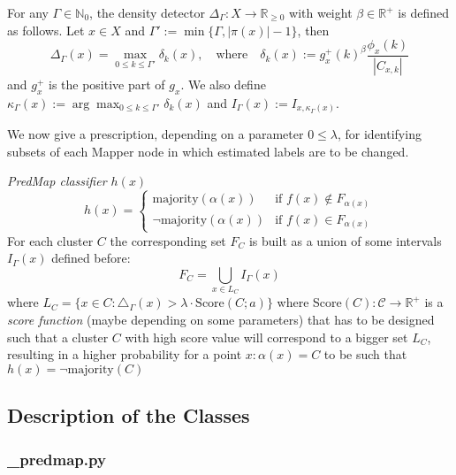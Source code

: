 \begin{definition}\label{def:}
	For any $\Gamma \in \mathbb{N}_0$, the density detector $\Delta_\Gamma : X \rightarrow \mathbb R_{\geq 0}$ with weight $\beta \in \mathbb R^+$ is defined as follows.  Let $x \in X$ and $\Gamma' := \min\{ \Gamma, |\pi(x)| - 1\}$, then
	\begin{equation*}
	\Delta_\Gamma (x)= \max\limits_{0 \leq k \leq \Gamma'} \delta_k(x), \quad \text{where} \quad \delta_k(x) := g_x^+(k)^{\beta} \frac{\phi_x(k)}{|C_{x,k}|}
	\end{equation*}
	and $g_x^+$ is the positive part of $g_x$.  We also define $\kappa_\Gamma(x) := \arg \max_{0 \leq k \leq \Gamma'}\delta_k(x)$ and $I_\Gamma(x) := I_{x, \kappa_\Gamma(x)}$.
\end{definition}

We now give a prescription, depending on a parameter $0 \leq \lambda$, for identifying subsets of each Mapper node in which estimated labels are to be changed. 

\begin{definition}{\textit{PredMap classifier $h(x)$}}\\
$$h(x) = \begin{cases}
\text{majority}(\alpha(x))& \text{if } f(x)\notin F_{\alpha(x)}\\
\lnot\text{majority}(\alpha(x))& \text{if } f(x)\in F_{\alpha(x)}
\end{cases}$$ For each cluster $C$ the corresponding set $F_C$ is built as a union of some intervals $I_\Gamma(x)$ defined before: $$F_C=\bigcup_{x\in L_C} I_\Gamma(x)$$ where $L_C = \{x\in C: \triangle_\Gamma(x)>\lambda\cdot \text{Score}(C;a)\}$ where Score$(C): \mathcal C\rightarrow \mathbb R^+$ is a \textit{score function} (maybe depending on some parameters)  that has to be designed such that a cluster $C$ with high score value will correspond to a bigger set $L_C$, resulting in a higher probability for a point $x: \alpha(x)=C$ to be such that $h(x)=\lnot \text{majority}(C)$
\end{definition}

\subsection{Description of the Classes}\label{sec:predmap description of the classes}

\subsubsection{\_predmap.py}
